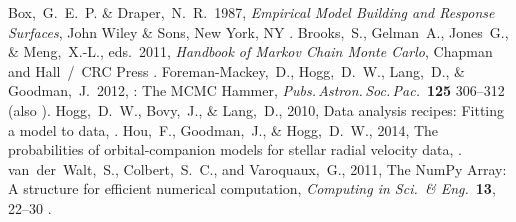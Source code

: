 \documentclass[12pt,twoside,pdftex]{article}
\begin{document}

\clearpage
{}\theendnotes

\clearpage
\raggedright
\begin{thebibliography}{}
  Box,~G.~E.~P. \& Draper,~N.~R.\ 1987,
  \textit{Empirical Model Building and Response Surfaces},
  John Wiley \& Sons, New York, NY
  .
  Brooks,~S., Gelman~A., Jones~G., \& Meng,~X.-L., eds.\ 2011,
  \textit{Handbook of Markov Chain Monte Carlo},
  Chapman and Hall~/~CRC Press
  .
  Foreman-Mackey,~D., Hogg,~D.~W., Lang,~D., \& Goodman,~J.\ 2012,
  : The MCMC Hammer,
  \textit{Pubs.\,Astron.\,Soc.\,Pac.}\ \textbf{125} 306--312
  (also ).
  Hogg,~D.~W., Bovy,~J., \& Lang,~D., 2010,
  Data analysis recipes: Fitting a model to data,
  .
  Hou,~F., Goodman,~J., \& Hogg,~D.~W., 2014,
  The probabilities of orbital-companion models for stellar radial velocity data,
  .
  van~der~Walt,~S., Colbert,~S.~C., and Varoquaux,~G., 2011,
  The NumPy Array: A structure for efficient numerical computation,
  \textit{Computing in Sci.\ \& Eng.}\ \textbf{13}, 22--30
  .
\end{thebibliography}
\end{document}
